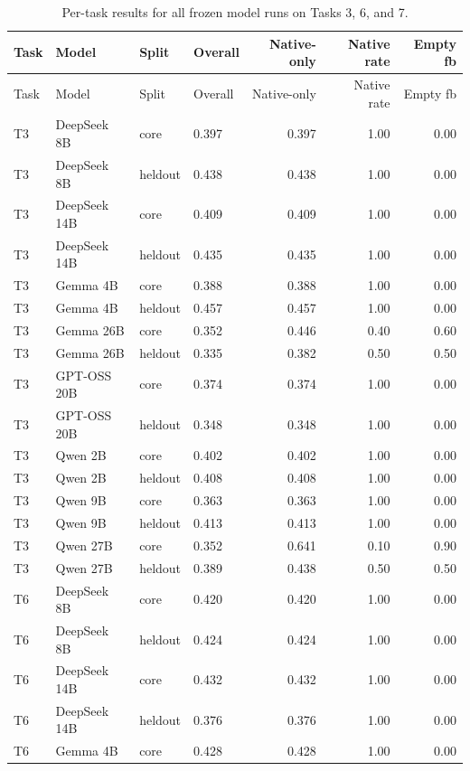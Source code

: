 \begin{longtable}{llllrrr}
\caption{Per-task results for all frozen model runs on Tasks 3, 6, and 7.} \label{tab:pertaskresults} \\
\toprule
Task & Model & Split & Overall & Native-only & Native rate & Empty fb \\
\midrule
\endfirsthead
\toprule
Task & Model & Split & Overall & Native-only & Native rate & Empty fb \\
\midrule
\endhead
    T3 & DeepSeek 8B & core & 0.397 & 0.397 & 1.00 & 0.00 \\
    T3 & DeepSeek 8B & heldout & 0.438 & 0.438 & 1.00 & 0.00 \\
    T3 & DeepSeek 14B & core & 0.409 & 0.409 & 1.00 & 0.00 \\
    T3 & DeepSeek 14B & heldout & 0.435 & 0.435 & 1.00 & 0.00 \\
    T3 & Gemma 4B & core & 0.388 & 0.388 & 1.00 & 0.00 \\
    T3 & Gemma 4B & heldout & 0.457 & 0.457 & 1.00 & 0.00 \\
    T3 & Gemma 26B & core & 0.352 & 0.446 & 0.40 & 0.60 \\
    T3 & Gemma 26B & heldout & 0.335 & 0.382 & 0.50 & 0.50 \\
    T3 & GPT-OSS 20B & core & 0.374 & 0.374 & 1.00 & 0.00 \\
    T3 & GPT-OSS 20B & heldout & 0.348 & 0.348 & 1.00 & 0.00 \\
    T3 & Qwen 2B & core & 0.402 & 0.402 & 1.00 & 0.00 \\
    T3 & Qwen 2B & heldout & 0.408 & 0.408 & 1.00 & 0.00 \\
    T3 & Qwen 9B & core & 0.363 & 0.363 & 1.00 & 0.00 \\
    T3 & Qwen 9B & heldout & 0.413 & 0.413 & 1.00 & 0.00 \\
    T3 & Qwen 27B & core & 0.352 & 0.641 & 0.10 & 0.90 \\
    T3 & Qwen 27B & heldout & 0.389 & 0.438 & 0.50 & 0.50 \\
    T6 & DeepSeek 8B & core & 0.420 & 0.420 & 1.00 & 0.00 \\
    T6 & DeepSeek 8B & heldout & 0.424 & 0.424 & 1.00 & 0.00 \\
    T6 & DeepSeek 14B & core & 0.432 & 0.432 & 1.00 & 0.00 \\
    T6 & DeepSeek 14B & heldout & 0.376 & 0.376 & 1.00 & 0.00 \\
    T6 & Gemma 4B & core & 0.428 & 0.428 & 1.00 & 0.00 \\

\end{longtable}
